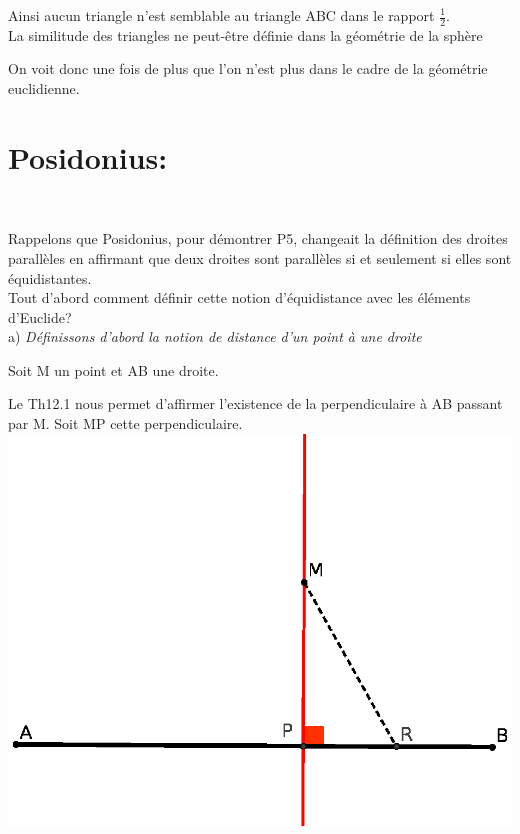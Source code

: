 \documentclass[a4paper, 12pt, twoside]{book}
\begin{document}
 Ainsi aucun triangle n'est semblable au triangle ABC dans le rapport $\frac{1}{2}$.\\
 
  
 La similitude des triangles ne peut-être définie dans la géométrie de la sphère
  
  
  
  
  
  On voit donc une fois de plus que l'on n'est plus dans le cadre de la géométrie euclidienne.
  
 \chapter{Posidonius:}\
 
 Rappelons que Posidonius, pour démontrer P5, changeait la définition des droites parallèles en affirmant que deux droites sont parallèles si et seulement si elles sont équidistantes.\\
 

 
 Tout d'abord comment définir cette notion d'équidistance avec les éléments d'Euclide? \\
 
a) \textit{Définissons d'abord la notion de distance d'un point à une droite}\

Soit M un point et AB une droite.  \

Le Th12.1 nous permet d'affirmer l'existence de la perpendiculaire à AB passant par M. Soit MP cette perpendiculaire.\\

 \includegraphics[scale=0.6]{figures/posi6.eps} \\
 
\end{document}

